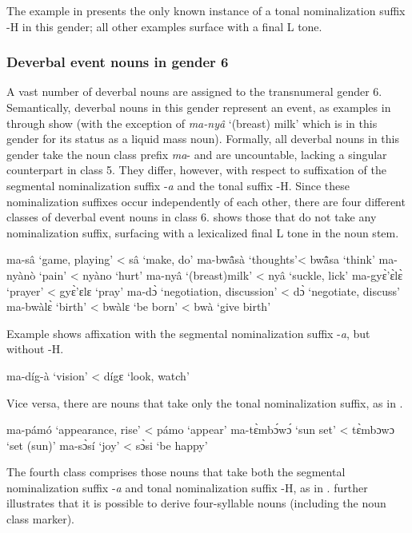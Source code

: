 \noindent The example in  presents the only known instance of a tonal nominalization suffix -H in this gender; all other examples surface with a final L tone.

\largerpage
\subsubsection{Deverbal event nouns in gender 6}
\label{sec:NOM6}

A vast number of deverbal nouns are assigned to the transnumeral gender 6. Semantically, deverbal nouns in this gender represent an event, as  examples in  through  show (with the exception of  {\itshape ma-nyâ} `(breast) milk' which is in this gender for its status as a liquid mass noun).
Formally, all deverbal nouns in this gender take the noun class prefix {\itshape ma}- and are uncountable, lacking a singular counterpart in class 5.  They differ, however, with respect to suffixation of the segmental nominalization suffix -{\itshape a} and the tonal suffix -H. Since these nominalization suffixes occur independently of each other, there are four different classes of deverbal event nouns in class 6.  shows those that do not take any nominalization suffix, surfacing with a lexicalized final L tone in the noun stem.

\ea \label{eventN1}
\ea  ma-sâ `game, playing'  < sâ `make, do'
\ex ma-bwã̂sà `thoughts'< bwã̂sa `think'
\ex ma-nyànò `pain' < nyàno `hurt'
\ex ma-nyâ `(breast)milk' < nyâ `suckle, lick'
\ex ma-gyɛ̀'ɛ̀lɛ̀ `prayer' < gyɛ̀'ɛlɛ `pray'
\ex ma-dɔ̀ `negotiation, discussion' < dɔ̀ `negotiate, discuss'
\ex ma-bwàlɛ̀ `birth' < bwàlɛ `be born' < bwà `give birth'
\z
\z

\noindent Example  shows affixation with the segmental nominalization suffix -{\itshape a}, but without -H.

\ea \label{eventN2} ma-díg-à `vision' < dígɛ `look, watch'
\z

Vice versa, there are nouns that take only the tonal nominalization suffix, as in .

\ea \label{eventN4}
\ea  ma-pámó `appearance, rise' < pámo `appear'
\ex ma-tɛ̀mbɔ́wɔ́ `sun set' < tɛ̀mbɔwɔ `set (sun)'
\ex ma-sɔ̀sí `joy'  < sɔ̀si `be happy'
\z
\z

The fourth class comprises those nouns that take both the segmental nominalization suffix -{\itshape a} and tonal nominalization suffix -H, as in .  further illustrates that it is possible to derive four-syllable nouns (including the noun class marker).

